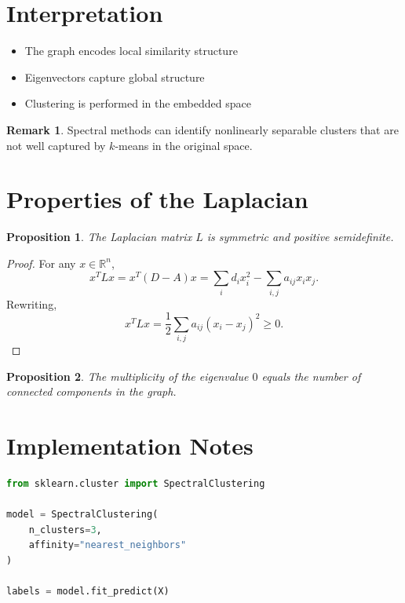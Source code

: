 \documentclass[12pt,oneside]{book}
\numberwithin{equation}{section}
\theoremstyle{definition}
\newtheorem{remark}{Remark}[section]
\theoremstyle{plain}
\newtheorem{proposition}{Proposition}[section]
\theoremstyle{remark}
\newcommand{\R}{\mathbb{R}}
\begin{document}
\section{Interpretation}

\begin{itemize}
    \item The graph encodes local similarity structure
    \item Eigenvectors capture global structure
    \item Clustering is performed in the embedded space
\end{itemize}

\begin{remark}
Spectral methods can identify nonlinearly separable clusters that are not well captured by $k$-means in the original space.
\end{remark}

\section{Properties of the Laplacian}

\begin{proposition}
The Laplacian matrix $L$ is symmetric and positive semidefinite.
\end{proposition}

\begin{proof}
For any $x \in \R^n$,
\[
x^T L x
=
x^T(D-A)x
=
\sum_{i} d_i x_i^2 - \sum_{i,j} a_{ij} x_i x_j.
\]
Rewriting,
\[
x^T L x
=
\frac{1}{2}
\sum_{i,j} a_{ij} (x_i - x_j)^2 \ge 0.
\]
\end{proof}

\begin{proposition}
The multiplicity of the eigenvalue $0$ equals the number of connected components in the graph.
\end{proposition}

\section{Implementation Notes}

\begin{lstlisting}[language=Python]
from sklearn.cluster import SpectralClustering

model = SpectralClustering(
    n_clusters=3,
    affinity="nearest_neighbors"
)

labels = model.fit_predict(X)
\end{lstlisting}
\end{document}
